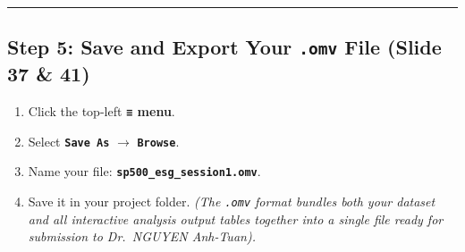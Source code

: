 \documentclass[
]{article}
\providecommand{\tightlist}{%
  \setlength{\itemsep}{0pt}\setlength{\parskip}{0pt}}
\begin{document}
\begin{center}\rule{0.5\linewidth}{0.5pt}\end{center}

\subsection{\texorpdfstring{Step 5: Save and Export Your \texttt{.omv}
File (Slide 37 \&
41)}{Step 5: Save and Export Your .omv File (Slide 37 \& 41)}}\label{step-5-save-and-export-your-.omv-file-slide-37-41}

\begin{enumerate}
\def\labelenumi{\arabic{enumi}.}
\tightlist
\item
  Click the top-left \textbf{\texttt{≡} menu}.
\item
  Select \textbf{\texttt{Save\ As}} \(\rightarrow\)
  \textbf{\texttt{Browse}}.
\item
  Name your file: \textbf{\texttt{sp500\_esg\_session1.omv}}.
\item
  Save it in your project folder. \emph{(The \texttt{.omv} format
  bundles both your dataset and all interactive analysis output tables
  together into a single file ready for submission to Dr.~NGUYEN
  Anh-Tuan).}
\end{enumerate}
\end{document}
